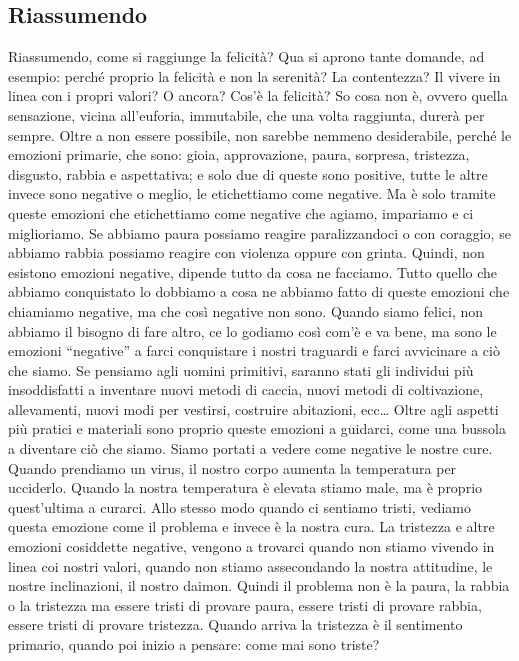 \documentclass[12pt]{book} %
\begin{document}
\subsection{Riassumendo}
Riassumendo, come si raggiunge la felicità? Qua si aprono tante domande, ad esempio: perché proprio la felicità e non la
serenità? La contentezza? Il vivere in linea con i propri valori? O ancora? Cos'è la felicità? So
cosa non è, ovvero quella sensazione, vicina all'euforia, immutabile, che una volta raggiunta,
durerà per sempre. Oltre a non essere possibile, non sarebbe nemmeno desiderabile, perché le emozioni primarie, che
sono: gioia, approvazione, paura, sorpresa, tristezza, disgusto, rabbia e aspettativa; e solo due di queste sono
positive, tutte le altre invece sono negative o meglio, le etichettiamo come negative. Ma è solo tramite queste
emozioni che etichettiamo come negative che agiamo, impariamo e ci miglioriamo. Se abbiamo paura possiamo reagire
paralizzandoci o con coraggio, se abbiamo rabbia possiamo reagire con violenza oppure con grinta. Quindi, non esistono
emozioni negative, dipende tutto da cosa ne facciamo. Tutto quello che abbiamo conquistato lo dobbiamo a cosa ne
abbiamo fatto di queste emozioni che chiamiamo negative, ma che così negative non sono. Quando siamo felici, non
abbiamo il bisogno di fare altro, ce lo godiamo così com'è e va bene, ma sono le emozioni
“negative” a farci conquistare i nostri traguardi e farci avvicinare a ciò che siamo. Se pensiamo agli uomini
primitivi, saranno stati gli individui più insoddisfatti a inventare nuovi metodi di caccia, nuovi metodi di
coltivazione, allevamenti, nuovi modi per vestirsi, costruire abitazioni, ecc… Oltre agli aspetti più pratici e
materiali sono proprio queste emozioni a guidarci, come una bussola a diventare ciò che siamo. Siamo portati a vedere
come negative le nostre cure. Quando prendiamo un virus, il nostro corpo aumenta la temperatura per ucciderlo. Quando
la nostra temperatura è elevata stiamo male, ma è proprio quest'ultima a curarci. Allo stesso modo
quando ci sentiamo tristi, vediamo questa emozione come il problema e invece è la nostra cura. La tristezza e altre
emozioni cosiddette negative, vengono a trovarci quando non stiamo vivendo in linea coi nostri valori, quando non
stiamo assecondando la nostra attitudine, le nostre inclinazioni, il nostro daimon. Quindi il problema non è la paura,
la rabbia o la tristezza ma essere tristi di provare paura, essere tristi di provare rabbia, essere tristi di provare
tristezza. Quando arriva la tristezza è il sentimento primario, quando poi inizio a pensare: come mai sono triste?
\end{document}
